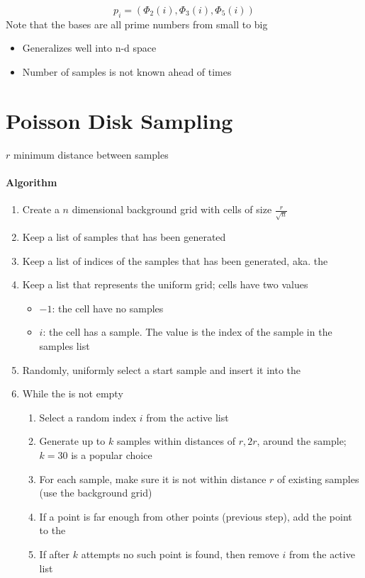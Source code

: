   \begin{equation}
    p_{i} =
    \left(
      \Phi_{2} \left( i \right),
      \Phi_{3} \left( i \right),
      \Phi_{5} \left( i \right)
    \right)
  \end{equation}
  Note that the bases are all prime numbers from small to big

  \begin{itemize}
    \item Generalizes well into n-d space
    \item Number of samples is not known ahead of times
  \end{itemize}

\section{Poisson Disk Sampling}

  $ r $ minimum distance between samples

  \paragraph{Algorithm}
  \begin{enumerate}
    \item Create a $ n $ dimensional background grid with cells of size
    $ \frac{r}{\sqrt{n}} $
    \item Keep a list of samples that has been generated
    \item Keep a list of indices of the samples that has been generated, aka.
    the 
    \item Keep a list that represents the uniform grid; cells have two values
    \begin{itemize}
      \item $ -1 $: the cell have no samples
      \item $ i $: the cell has a sample. The value is the index of the sample
      in the samples list
    \end{itemize}

    \item Randomly, uniformly select a start sample and insert it into the
    \item While the  is not empty
    \begin{enumerate}
      \item Select a random index $ i $ from the active list
      \item Generate up to $ k $ samples within distances of $ r, 2r $,
      around the sample; $ k = 30 $ is a popular choice
      \item For each sample, make sure it is not within distance $ r $ of
      existing samples (use the background grid)
      \item If a point is far enough from other points (previous step), add
      the point to the 
      \item If after $ k $ attempts no such point is found, then remove $ i $
      from the active list
    \end{enumerate}
  \end{enumerate}

